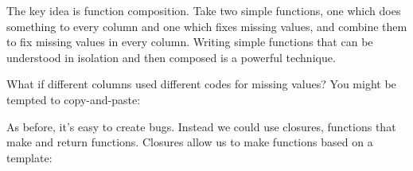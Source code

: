 The key idea is function composition. Take two simple functions, one
which does something to every column and one which fixes missing values,
and combine them to fix missing values in every column. Writing simple
functions that can be understood in isolation and then composed is a
powerful technique.

What if different columns used different codes for missing values? You
might be tempted to copy-and-paste:

\begin{Shaded}
\begin{Highlighting}[]
\NormalTok{ <-}\StringTok{ }
\NormalTok{  x[x }\OperatorTok{==}\StringTok{ }\NormalTok{] <-}\StringTok{ }
\NormalTok{\}}
\NormalTok{ <-}\StringTok{ }
\NormalTok{  x[x }\OperatorTok{==}\StringTok{ }\NormalTok{] <-}\StringTok{ }
\NormalTok{\}}
\NormalTok{ <-}\StringTok{ }
\NormalTok{  x[x }\OperatorTok{==}\StringTok{ }\NormalTok{] <-}\StringTok{ }
\NormalTok{\}}
\end{Highlighting}
\end{Shaded}

As before, it's easy to create bugs. Instead we could use closures,
functions that make and return functions. Closures allow us to make
functions based on a template:

\begin{Shaded}
\begin{Highlighting}[]
\StringTok{ }
\NormalTok{    x[x }\OperatorTok{==}\StringTok{ }\NormalTok{na_value] <-}\StringTok{ }
\NormalTok{  \}}
\NormalTok{\}}
\NormalTok{ <-}\StringTok{ }\NormalTok{(}\OperatorTok{-}\NormalTok{)}
\NormalTok{ <-}\StringTok{ }\NormalTok{(}\OperatorTok{-}\NormalTok{)}

\NormalTok{(}\NormalTok{(}\OperatorTok{-}\NormalTok{, }\NormalTok{))}
\end{Highlighting}
\end{Shaded}

